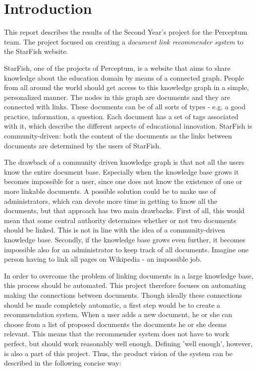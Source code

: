 

\section{Introduction}

This report describes the results of the Second Year's project for the Perceptum team. The project focused on creating a \emph{document link recommender system} to the StarFish website. 

StarFish, one of the projects of Perceptum, is a website that aims to share knowledge about the education domain by means of a connected graph. People from all around the world should get access to this knowledge graph in a simple, personalized manner. The nodes in this graph are documents and they are connected with links. These documents can be of all sorts of types - e.g. a good practice, information, a question. Each document has a set of tags associated with it, which describe the different aspects of educational innovation. StarFish is community-driven: both the content of the documents as the links between documents are determined by the users of StarFish. 

The drawback of a community driven knowledge graph is that not all the users know the entire document base. Especially when the knowledge base grows it becomes impossible for a user, since one does not know the existence of one or more linkable documents. A possible solution could be to make use of administrators, which can devote more time in getting to know all the documents, but that approach has two main drawbacks. First of all, this would mean that some central authority determines whether or not two documents should be linked. This is not in line with the idea of a community-driven knowledge base. Secondly, if the knowledge base grows even further, it becomes impossible also for an administrator to keep track of all documents. Imagine one person having to link all pages on Wikipedia - an impossible job. 

In order to overcome the problem of linking documents in a large knowledge base, this process should be automated. This project therefore focuses on automating making the connections between documents. Though ideally these connections should be made completely automatic, a first step would be to create a recommendation system. When a user adds a new document, he or she can choose from a list of proposed documents the documents he or she deems relevant. This means that the recommender system does not have to work perfect, but should work reasonably well enough. Defining 'well enough', however, is also a part of this project. Thus, the product vision of the system can be described in the following concise way:

